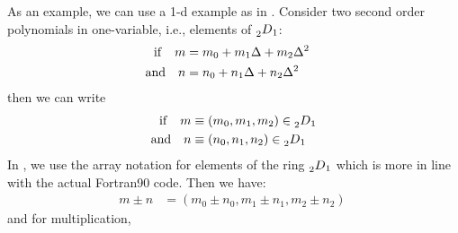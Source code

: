 \documentclass{hitec}     %
\begin{document}
{{{As an example, we can use a 1-d example as in . Consider  two second order polynomials in one-variable, i.e., elements of $\prescript{}{2}{D}_{1}$:
%
\begin{align}~{\rm i}{\rm f}~~~m&={m}_{0}+{m}_{1}\Delta +{m}_{2}{\Delta }^{2}\ \ \ \nonumber \\
 {\rm a}{\rm n}{\rm d} ~~~n&={n}_{0}+{n}_{1}\Delta +{n}_{2}{\Delta }^{2}\ \ \ \ \label{eq:nodnv}\end{align}
then we can write
%
\begin{align}~{\rm i}{\rm f}~~~m&\equiv \left({{m}_{0},{m}_{1},{m}_{2}}\right)\in \prescript{}{2}{D}_{1}\nonumber \\
 {\rm a}{\rm n}{\rm d} ~~~n&\equiv \left({{n}_{0},{n}_{1},{n}_{2}}\right)\in \prescript{}{2}{D}_{1}\label{eq:nodnv1}\end{align}
%
 In , we use the array notation for elements of the ring $\prescript{}{2}{D}_{1}$ which is more in line with the actual Fortran90 code.
Then we have:
%
\begin{align}m\pm n&=\left({{m}_{0}\pm {n}_{0},{m}_{1}\pm {n}_{1},{m}_{2}\pm {n}_{2}}\right)\ \label{eq:nodnvpm}\end{align}
and for multiplication,
%
}}}
\end{document}
